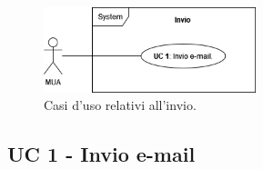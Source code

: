 
\begin{figure}[H]
    \includegraphics[width=0.55\textwidth]{sections/uc_imgs/UC-invio.png}
    \centering
    \caption{Casi d'uso relativi all'invio.}
\end{figure}

\subsection{UC 1 - Invio e-mail} \label{sec:UC1}
    
